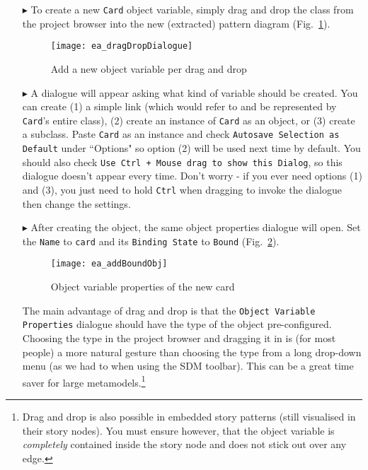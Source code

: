 \begin{itemize}
\vspace{0.5cm}

\item[$\blacktriangleright$] To create a new \texttt{Card} object variable, simply drag and drop the class from the project browser into the new (extracted)
pattern diagram (Fig.~\ref{fig:sdm_check_bound_card}).

\begin{figure}[htbp]
\begin{center}
  \texttt{[image: ea\_dragDropDialogue]}
  \caption{Add a new object variable per drag and drop}
  \label{fig:sdm_check_bound_card}
\end{center}
\end{figure}

\item[$\blacktriangleright$] A dialogue will appear asking what kind of variable should be created. You can create (1) a simple link (which would refer to and
be represented by \texttt{Card}'s entire class), (2) create an instance of \texttt{Card} as an object, or (3) create a subclass. Paste \texttt{Card} as an
instance and check \texttt{Autosave Selection as Default} under ``Options" so option (2) will be used next time by default. You should also check \texttt{Use
Ctrl + Mouse drag to show this Dialog}, so this dialogue doesn't appear every time. Don't worry - if you ever need options (1) and (3), you  just need to hold
\texttt{Ctrl} when dragging to invoke the dialogue then change the settings.

\item[$\blacktriangleright$] After creating the object, the same object properties dialogue will open.  Set the \texttt{Name} to \texttt{card} and its
\texttt{Binding State} to \texttt{Bound} (Fig.~\ref{fig:sdm_new_card_properties}).

\newpage

\begin{figure}[htbp]
\begin{center}
  \texttt{[image: ea\_addBoundObj]}
  \caption{Object variable properties of the new card}
  \label{fig:sdm_new_card_properties}
\end{center}
\end{figure}

The main advantage of drag and drop is that the \texttt{Object Variable Pro\-per\-ties} dialogue should have the type of the object pre-configured. Choosing
the type in the project browser and dragging it in is (for most people) a more natural gesture than choosing the type from a long drop-down menu (as we had to
when using the SDM toolbar). This can be a great time saver for large metamodels.\footnote{Drag and drop is also possible in embedded story patterns
(still visualised in their story nodes).  You must ensure however, that the object variable is \emph{completely} contained inside the story node and does not
stick out over any edge.}


\end{itemize}
